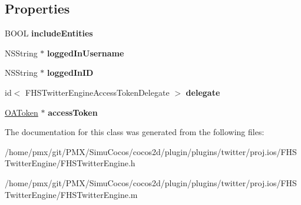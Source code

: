 \subsection*{Properties}
\begin{DoxyCompactItemize}
\item 
\mbox{\label{interfaceFHSTwitterEngine_a591dfcfd0492fb058c000b4b7aa1e17a}} 
B\+O\+OL {\bfseries include\+Entities}
\item 
\mbox{\label{interfaceFHSTwitterEngine_ac70e0ba02a72fc99244e8d3a0de6114d}} 
N\+S\+String $\ast$ {\bfseries logged\+In\+Username}
\item 
\mbox{\label{interfaceFHSTwitterEngine_a4204b422526796187dbd0fe55a5dde03}} 
N\+S\+String $\ast$ {\bfseries logged\+In\+ID}
\item 
\mbox{\label{interfaceFHSTwitterEngine_a922aa220758d2d6945296ae1aec7dcc2}} 
id$<$ F\+H\+S\+Twitter\+Engine\+Access\+Token\+Delegate $>$ {\bfseries delegate}
\item 
\mbox{\label{interfaceFHSTwitterEngine_a77fabbbcc8a440635b4d6b72a6e6a501}} 
\hyperlink{interfaceOAToken}{O\+A\+Token} $\ast$ {\bfseries access\+Token}
\end{DoxyCompactItemize}


The documentation for this class was generated from the following files\+:\begin{DoxyCompactItemize}
\item 
/home/pmx/git/\+P\+M\+X/\+Simu\+Cocos/cocos2d/plugin/plugins/twitter/proj.\+ios/\+F\+H\+S\+Twitter\+Engine/F\+H\+S\+Twitter\+Engine.\+h\item 
/home/pmx/git/\+P\+M\+X/\+Simu\+Cocos/cocos2d/plugin/plugins/twitter/proj.\+ios/\+F\+H\+S\+Twitter\+Engine/F\+H\+S\+Twitter\+Engine.\+m\end{DoxyCompactItemize}
